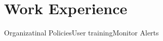 \documentclass[a4paper,draft,12pt]{moderncv}
\begin{document}
\maketitle
\section{Work Experience}
%
    {Organizatinal Policies\newline{}User training\newline{}Monitor Alerts}
\end{document}
